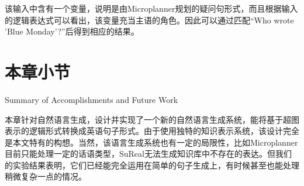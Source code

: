 该输入中含有一个变量，说明是由Microplanner规划的疑问句形式，而且根据输入的逻辑表达式可以看出，该变量充当主语的角色。因此可以通过匹配“Who wrote 'Blue Monday'?”后得到相应的结果。

\section{本章小节}{Summary of Accomplishments and Future Work}

本章针对自然语言生成，设计并实现了一个新的自然语言生成系统，能将基于超图表示的逻辑形式转换成英语句子形式。由于使用独特的知识表示系统，该设计完全是本文特有的构想。当然，该语言生成系统也有一定的局限性，比如Microplanner目前只能处理一定的话语类型，SuReal无法生成知识库中不存在的表达。但我们的实验结果表明，它们已经能完全运用在简单的句子生成上，有时候甚至也能处理稍微复杂一点的情况。
